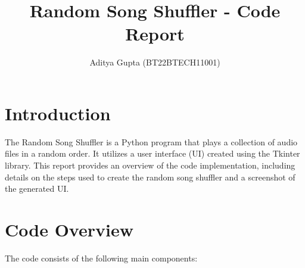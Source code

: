 \documentclass{article}
\title{Random Song Shuffler - Code Report}
\author{Aditya Gupta (BT22BTECH11001)}
\begin{document}
\maketitle

\section{Introduction}
The Random Song Shuffler is a Python program that plays a collection of audio files in a random order. It utilizes a user interface (UI) created using the Tkinter library. This report provides an overview of the code implementation, including details on the steps used to create the random song shuffler and a screenshot of the generated UI.

\section{Code Overview}
The code consists of the following main components:
\end{document}
